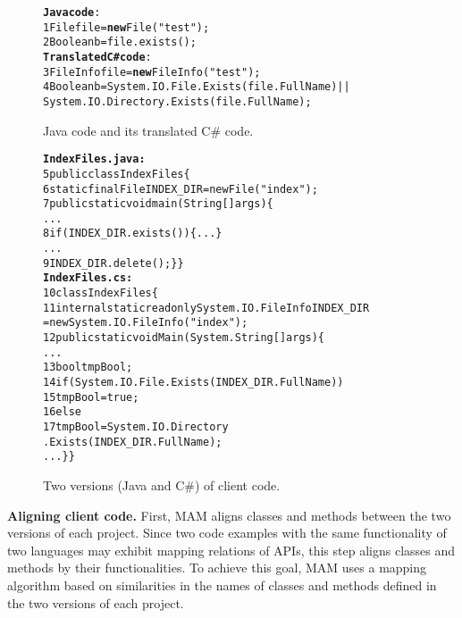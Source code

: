 \begin{figure}[t]
\begin{CodeOut}
\begin{alltt}
\textbf{Java code}:
1  File file = \textbf{new} File("test");
2  Boolean b = file.exists();
\textbf{Translated C\# code}:
3  FileInfo file = \textbf{new} FileInfo("test");
4  Boolean b = System.IO.File.Exists(file.FullName)||
           System.IO.Directory.Exists(file.FullName);
\end{alltt}
\end{CodeOut}\vspace*{-5ex}
\caption{\label{fig:challenge}Java code and its translated C\# code.}\vspace*{-2ex}
\end{figure}
\begin{figure}[t]
\begin{CodeOut}\vspace*{-1ex}
\begin{alltt}
\textbf{IndexFiles.java:}
5 public class IndexFiles \{
6   static final File INDEX_DIR = new File("index");
7   public static void main(String[] args) \{
      ...
8     if (INDEX_DIR.exists()) \{...\}
      ...
9       INDEX_DIR.delete(); \} \}
\textbf{IndexFiles.cs:}
10 class IndexFiles\{
11   internal static readonly System.IO.FileInfo INDEX_DIR
          = new System.IO.FileInfo("index");
12   public static void  Main(System.String[] args)\{
      ...
13     bool tmpBool;
14     if (System.IO.File.Exists(INDEX_DIR.FullName))
15       tmpBool = true;
16    else
17       tmpBool = System.IO.Directory
                         .Exists(INDEX_DIR.FullName);
      ... \} \}
\end{alltt}
\end{CodeOut}\vspace*{-4ex}
\caption{\label{fig:clientcode} Two versions (Java and C\#) of
client code.}\vspace*{-5ex}
\end{figure}

\textbf{Aligning client code.} First, MAM aligns classes and methods
between the two versions of each project. Since two code examples with
the same functionality of two languages may exhibit mapping
relations of APIs, this step aligns classes and methods by their
functionalities. To achieve this goal, MAM uses a mapping algorithm
based on similarities in the names of classes and methods defined
in the two versions of each project.

